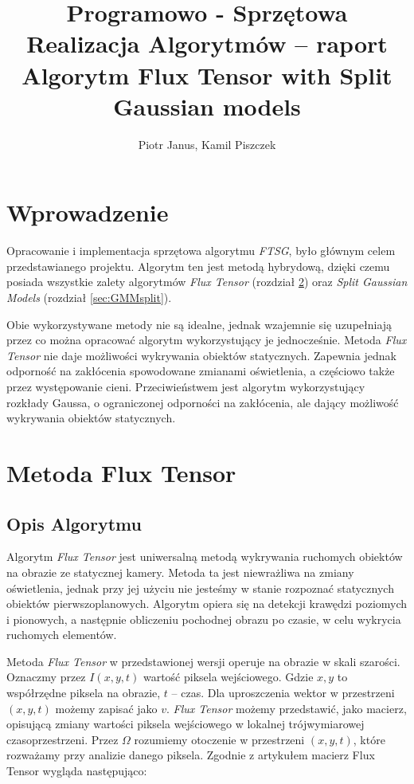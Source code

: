 \documentclass[10pt,a4paper]{article}
\begin{document}
	\title{Programowo - Sprzętowa Realizacja Algorytmów -- raport  \\  Algorytm Flux Tensor with Split Gaussian models}
	\author{Piotr Janus, Kamil Piszczek}
	\date{}
	\maketitle


\section{Wprowadzenie}

Opracowanie i implementacja sprzętowa algorytmu \textit{FTSG}, było głównym celem przedstawianego projektu. Algorytm ten jest metodą hybrydową, dzięki czemu posiada wszystkie zalety algorytmów \textit{Flux Tensor} (rozdział \ref{sec:FluxTensor_Teoria}) oraz \textit{Split Gaussian Models} (rozdział \ref{sec:GMMsplit}).   

Obie wykorzystywane metody nie są idealne, jednak wzajemnie się uzupełniają przez co można opracować algorytm wykorzystujący je jednocześnie. Metoda \textit{Flux Tensor} nie daje możliwości wykrywania obiektów statycznych. Zapewnia jednak odporność na zakłócenia spowodowane zmianami oświetlenia, a częściowo także przez występowanie cieni. Przeciwieństwem jest algorytm wykorzystujący rozkłady Gaussa, o ograniczonej odporności na zakłócenia, ale dający możliwość wykrywania obiektów statycznych. 

\section{Metoda Flux Tensor}
\label{sec:FluxTensor_Teoria}

\subsection{Opis Algorytmu}
\label{sec:FluxTensorOpis}

Algorytm \textit{Flux Tensor} jest uniwersalną metodą wykrywania ruchomych obiektów na obrazie ze statycznej kamery. Metoda ta jest niewrażliwa na zmiany oświetlenia, jednak przy jej użyciu nie jesteśmy w stanie rozpoznać statycznych obiektów pierwszoplanowych. Algorytm opiera się na detekcji krawędzi poziomych i pionowych, a następnie obliczeniu pochodnej obrazu po czasie, w celu wykrycia ruchomych elementów.

Metoda \emph{Flux Tensor} w przedstawionej wersji operuje na obrazie w skali szarości. Oznaczmy przez $I(x,y,t)$ wartość piksela wejściowego. Gdzie $x,y$ to współrzędne piksela na obrazie, $t$ – czas. Dla uproszczenia wektor w przestrzeni $(x,y,t)$ możemy zapisać jako $v$.
\textit{Flux Tensor} możemy przedstawić, jako macierz, opisującą zmiany wartości piksela wejściowego w lokalnej trójwymiarowej czasoprzestrzeni. Przez $\Omega$ rozumiemy otoczenie w przestrzeni $(x,y,t)$, które rozważamy przy analizie danego piksela. Zgodnie z artykułem \cite{wang_14} macierz Flux Tensor wygląda następująco:
 
\end{document}
